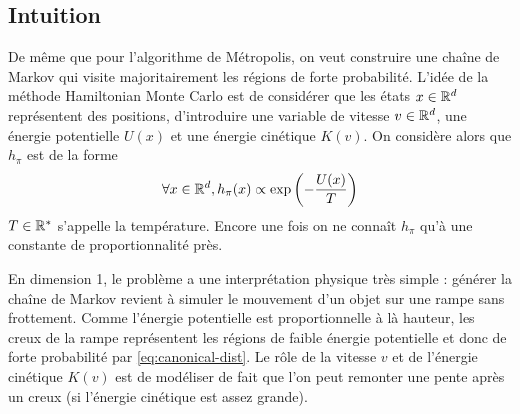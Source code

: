 \documentclass[10pt,a4paper]{article}
\begin{document}
\subsection{Intuition}
De même que pour l'algorithme de Métropolis, on veut construire une chaîne de Markov qui visite majoritairement les régions de forte probabilité. L'idée de la méthode Hamiltonian Monte Carlo est de considérer que les états $x \in \mathbb{R}^d$ représentent des positions, d'introduire une variable de vitesse $v \in \mathbb{R}^d$, une énergie potentielle $U(x)$ et une énergie cinétique $K(v)$. On considère alors que $h_\pi$ est de la forme
\begin{equation}\label{eq:canonical-dist}
\forall x \in \mathbb{R}^d,  h_\pi(x) \propto \exp \left( -\frac{U(x)}{T} \right) 
\end{equation}
$T \in \mathbb{R}^*$ s'appelle la température. Encore une fois on ne connaît $h_\pi$ qu'à une constante de proportionnalité près.

En dimension 1, le problème a une interprétation physique très simple : générer la chaîne de Markov revient à simuler le mouvement d'un objet sur une rampe sans frottement. Comme l'énergie potentielle est proportionnelle à là hauteur, les creux de la rampe représentent les régions de faible énergie potentielle et donc de forte probabilité par \eqref{eq:canonical-dist}. Le rôle de la vitesse $v$ et de l'énergie cinétique $K(v)$ est de modéliser de fait que l'on peut remonter une pente après un creux (si l'énergie cinétique est assez grande).

\pagebreak


\end{document}
